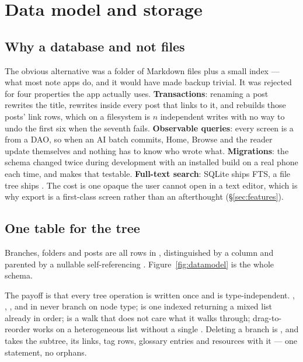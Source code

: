 \section{Data model and storage}
\label{sec:data}

\subsection{Why a database and not files}

The obvious alternative was a folder of Markdown files plus a small index --- what most note apps do,
and it would have made backup trivial. It was rejected for four properties the app actually uses.
\textbf{Transactions}: renaming a post rewrites the title, rewrites  inside every
post that links to it, and rebuilds those posts' link rows, which on a filesystem is $n$ independent
writes with no way to undo the first six when the seventh fails. \textbf{Observable queries}: every
screen is a  from a DAO, so when an AI batch commits, Home, Browse and the reader update
themselves and nothing has to know who wrote what. \textbf{Migrations}: the schema changed twice
during development with an installed build on a real phone each time, and 
makes that testable. \textbf{Full-text search}: SQLite ships FTS, a file tree ships . The
cost is one opaque  the user cannot open in a text editor, which is why
export is a first-class screen rather than an afterthought (\S\ref{sec:features}).

\subsection{One table for the tree}

Branches, folders and posts are all rows in , distinguished by a  column and
parented by a nullable self-referencing . Figure~\ref{fig:datamodel} is the whole
schema.



The payoff is that every tree operation is written once and is type-independent. ,
, ,  and  in  never branch on
node type;  is one indexed  returning a mixed list already in
 order;  is a  walk that does not care what it
walks through; drag-to-reorder works on a heterogeneous list without a single
. Deleting a branch is , and
 takes the subtree, its links, tag rows, glossary entries and resources with
it --- one statement, no orphans.

